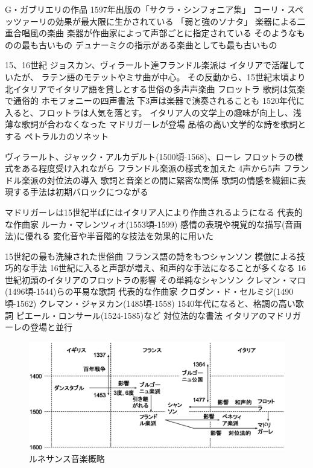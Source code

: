 \documentclass[a4j]{jarticle}
\begin{document}
G・ガブリエリの作品
1597年出版の「サクラ・シンフォニア集」
コーリ・スペッツァーリの効果が最大限に生かされている
「弱と強のソナタ」
楽器による二重合唱風の楽曲
楽器が作曲家によって声部ごとに指定されている
そのようなものの最も古いもの
デュナーミクの指示がある楽曲としても最も古いもの

15、16世紀
ジョスカン、ヴィラールト達フランドル楽派は
イタリアで活躍していたが、
ラテン語のモテットやミサ曲が中心。
その反動から、15世紀末頃より
北イタリアでイタリア語を貸しとする世俗の多声声楽曲
フロットラ
歌詞は気楽で通俗的
ホモフォニーの四声書法
下3声は楽器で演奏されることも
1520年代に入ると、フロットラは人気を落とす。
イタリア人の文学上の趣味が向上し、浅薄な歌詞が合わなくなった
マドリガーレが登場
品格の高い文学的な詩を歌詞とする
ペトラルカのソネット

ヴィラールト、ジャック・アルカデルト(1500頃-1568)、ローレ
フロットラの様式をある程度受け入れながら
フランドル楽派の様式を加えた
4声から5声
フランドル楽派の対位法の導入
歌詞と音楽との間に緊密な関係
歌詞の情感を繊細に表現する手法は初期バロックにつながる

マドリガーレは15世紀半ばにはイタリア人により作曲されるようになる
代表的な作曲家
ルーカ・マレンツィオ(1553頃-1599)
感情の表現や視覚的な描写(音画法)に優れる
変化音や半音階的な技法を効果的に用いた

15世紀の最も洗練された世俗曲
フランス語の詩をもつシャンソン
模倣による技巧的な手法
16世紀に入ると声部が増え、和声的な手法になることが多くなる
16世紀初頭のイタリアのフロットラの影響
その単純なシャンソン
クレマン・マロ(1496頃-1544)らの平易な歌詞
代表的な作曲家
クロダン・ド・セルミジ(1490頃-1562)
クレマン・ジャヌカン(1485頃-1558)
1540年代になると、格調の高い歌詞
ピエール・ロンサール(1524-1585)など
対位法的な書法
イタリアのマドリガーレの登場と並行

\begin{figure}[tb]
 \begin{center}
  \includegraphics[width=\hsize]{fig/renaissance_summary.eps}
  \caption{ルネサンス音楽概略}
  \label{fig:renaissance_summary}
 \end{center}
\end{figure}
\end{document}
